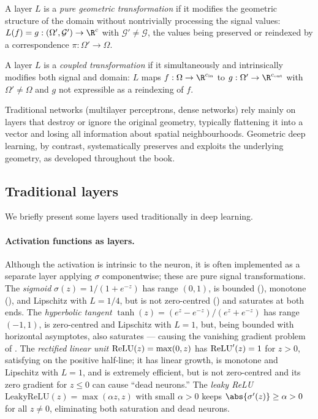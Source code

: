 \begin{definition}
\label{def:found:geometry-transform}
A layer $L$ is a \emph{pure geometric transformation} if it modifies the
geometric structure of the domain without nontrivially processing the signal
values: $L(f) = g : (\Omega', \mathcal{G}') \to \R^c$ with
$\mathcal{G}' \ne \mathcal{G}$, the values being preserved or reindexed by a
correspondence $\pi : \Omega' \to \Omega$.
\end{definition}

\begin{definition}
\label{def:found:coupled-transform}
A layer $L$ is a \emph{coupled transformation} if it simultaneously and
intrinsically modifies both signal and domain: $L$ maps
$f : \Omega \to \R^{c_{\mathrm{in}}}$ to $g : \Omega' \to \R^{c_{\mathrm{out}}}$
with $\Omega' \ne \Omega$ and $g$ not expressible as a reindexing of $f$.
\end{definition}

Traditional networks (multilayer perceptrons, dense networks) rely mainly on
layers that destroy or ignore the original geometry, typically flattening it into
a vector and losing all information about spatial neighbourhoods. Geometric deep
learning, by contrast, systematically preserves and exploits the underlying
geometry, as developed throughout the book.

\subsection{Traditional layers}
\label{sec:found:traditional-layers}

We briefly present some layers used traditionally in deep learning.

\paragraph{Activation functions as layers.}
Although the activation is intrinsic to the neuron, it is often implemented as a
separate layer applying $\sigma$ componentwise; these are pure signal
transformations. The \emph{sigmoid}
$\sigma(z) = 1/(1+e^{-z})$ has range $(0,1)$, is bounded
(), monotone (), and Lipschitz
with $L = 1/4$, but is not zero-centred () and
saturates at both ends. The \emph{hyperbolic tangent}
$\tanh(z) = (e^z - e^{-z})/(e^z + e^{-z})$ has range $(-1,1)$, is zero-centred
and Lipschitz with $L = 1$, but, being bounded with horizontal asymptotes, also
saturates --- causing the vanishing gradient problem of .
The \emph{rectified linear unit} $\operatorname{ReLU}(z) = \max(0, z)$ has
$\operatorname{ReLU}'(z) = 1$ for $z > 0$, satisfying  on the
positive half-line; it has linear growth, is monotone and Lipschitz with $L=1$,
and is extremely efficient, but is not zero-centred and its zero gradient for
$z \le 0$ can cause ``dead neurons.'' The \emph{leaky ReLU}
$\mathrm{LeakyReLU}(z) = \max(\alpha z, z)$ with small $\alpha > 0$ keeps
$\abs{\sigma'(z)} \ge \alpha > 0$ for all $z \ne 0$, eliminating both saturation
and dead neurons.

